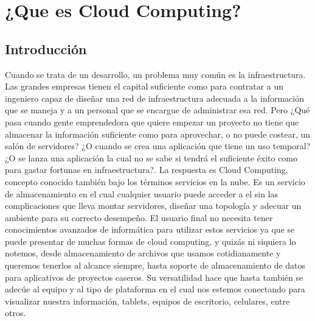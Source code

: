 \documentclass[12pt,a4paper]{article}
\author{Ignacio Perez Laborda}
\begin{document}


\tableofcontents

\listoffigures

\newpage

\section{¿Que es Cloud Computing?}

\subsection{Introducción}
Cuando se trata de un desarrollo, un problema muy común es la
infraestructura. Las grandes empresas tienen el capital
suficiente como para contratar a un ingeniero capaz de diseñar
una red de infraestructura adecuada a la información que se
maneja y a un personal que se encargue de administrar esa
red. Pero ¿Qué pasa cuando gente emprendedora que quiere empezar
un proyecto no tiene que almacenar la información suficiente
como para aprovechar, o no puede costear, un salón de
servidores? ¿O cuando se crea una aplicación que tiene un uso
temporal? ¿O se lanza una aplicación la cual no se sabe si
tendrá el suficiente éxito como para gastar fortunas en
infraestructura?. La respuesta es Cloud Computing, concepto
conocido también bajo los términos servicios en la nube. Es un
servicio de almacenamiento en el cual cualquier usuario puede
acceder a el sin las complicaciones que lleva montar
servidores, diseñar una topología y adecuar un ambiente para su
correcto desempeño. El usuario final no necesita tener
conocimientos avanzados de informática para utilizar estos
servicios ya que se puede presentar de muchas formas de cloud
computing, y quizás ni siquiera lo notemos, desde almacenamiento
de archivos que usamos cotidianamente y queremos tenerlos al
alcance siempre, hasta soporte de almacenamiento de datos para
aplicativos de proyectos caseros. Su versatilidad hace que hasta
también se adecúe al equipo y al tipo de plataforma en el cual
nos estemos conectando para visualizar nuestra información,
tablets, equipos de escritorio, celulares, entre otros.\par
\end{document}
